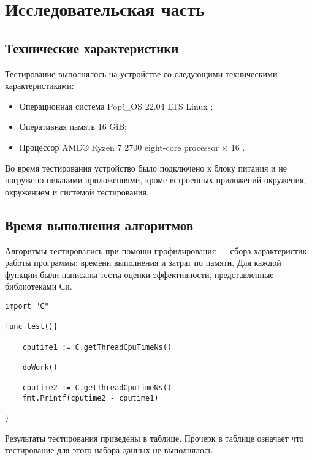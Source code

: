 \chapter{Исследовательская часть}
\section{Технические характеристики}
Тестирование выполнялось на устройстве со следующими техническими характеристиками:
\begin{itemize}
	\item Операционная система Pop!\_OS 22.04 LTS \cite{ubuntu} Linux \cite{linux};
	\item Оперативная память 16 GiB;
	\item Процессор AMD® Ryzen 7 2700 eight-core processor × 16 \cite{amd}.
\end{itemize}
Во время тестирования устройство было подключено к блоку питания и не нагружено никакими приложениями, кроме встроенных приложений окружения, окружением и системой тестирования.
\section{Время выполнения алгоритмов}
Алгоритмы тестировались при помощи профилирования --- сбора характеристик работы программы: времени выполнения и затрат по памяти. Для каждой функции были написаны тесты оценки эффективности, представленные библиотеками Си.

\begin{lstlisting}[label=bench,caption=Пример теста эффективности]
import "C"	

func test(){
	
	cputime1 := C.getThreadCpuTimeNs()
	
	doWork()
	
	cputime2 := C.getThreadCpuTimeNs()
	fmt.Printf(cputime2 - cputime1)
	
}
\end{lstlisting}

Результаты тестирования приведены в таблице. Прочерк в таблице означает что тестирование для этого набора данных не выполнялось.


